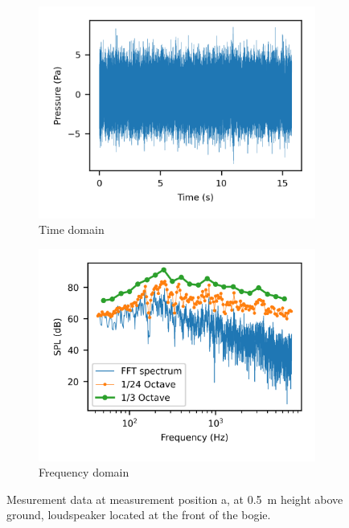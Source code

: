 \begin{figure}[H]
    \centering
    \begin{subfigure}[b]{0.48\textwidth}
        \centering
        \includegraphics{fig/time_signal.png}
        \caption{Time domain}
        \label{fig:timedomain}
    \end{subfigure}
    \begin{subfigure}[b]{0.48\textwidth}
        \centering
        \includegraphics{fig/fft_spectra.png}
        \caption{Frequency domain}
        \label{fig:frequencydomain}
    \end{subfigure}
    
    \caption{Mesurement data at measurement position a, at \SI{0.5}{\meter} height above ground, loudspeaker located at the front of the bogie.}
    \label{fig:measurementsignal}
\end{figure}

